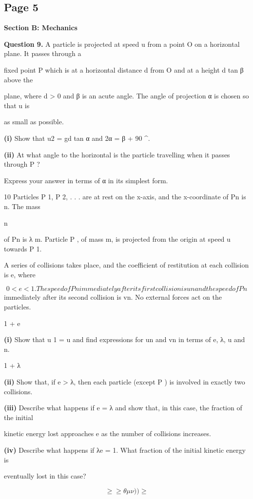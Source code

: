 \documentclass[12pt]{article}
\begin{document}
\subsection*{Page 5}
\begin{flushleft}
\bigskip\textbf{Section B: Mechanics}\par
\bigskip\textbf{Question 9.} A particle is projected at speed u from a point O on a horizontal plane. It passes through a\par
fixed point P which is at a horizontal distance d from O and at a height d tan β above the\par
plane, where d > 0 and β is an acute angle. The angle of projection α is chosen so that u is\par
as small as possible.\par
\textbf{(i)} Show that u2 = gd tan α and 2α = β + 90 \textasciicircum{}\circ .\par
\textbf{(ii)} At what angle to the horizontal is the particle travelling when it passes through P ?\par
Express your answer in terms of α in its simplest form.\par
10 Particles P 1, P 2, . . . are at rest on the x-axis, and the x-coordinate of Pn is n. The mass\par
n\par
of Pn is λ m. Particle P , of mass m, is projected from the origin at speed u towards P 1.\par
A series of collisions takes place, and the coefficient of restitution at each collision is e, where\par
\[0 < e < 1. The speed of Pn immediately after its first collision is un and the speed of Pn\]
immediately after its second collision is vn. No external forces act on the particles.\par
1 + e\par
\textbf{(i)} Show that u 1 = u and find expressions for un and vn in terms of e, λ, u and n.\par
1 + λ\par
\textbf{(ii)} Show that, if e > λ, then each particle (except P ) is involved in exactly two collisions.\par
\textbf{(iii)} Describe what happens if e = λ and show that, in this case, the fraction of the initial\par
kinetic energy lost approaches e as the number of collisions increases.\par
\textbf{(iv)} Describe what happens if λe = 1. What fraction of the initial kinetic energy is\par
eventually lost in this case?\par
\[\geq\geq\theta\mu\nu) ) \geq\]
\end{flushleft}
\end{document}
